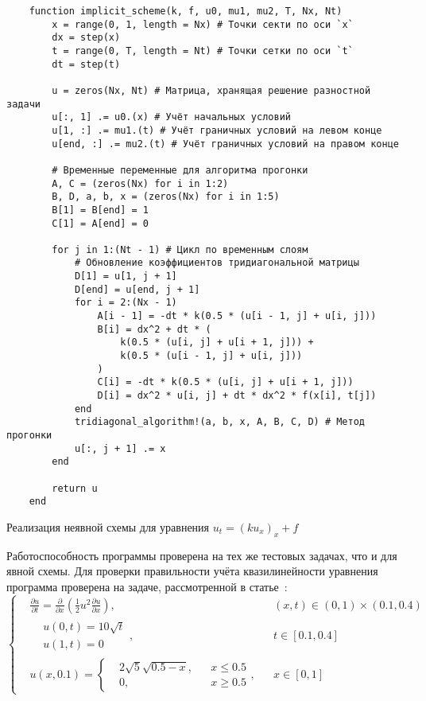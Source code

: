 \begin{listing}
    \begin{verbatim}
    function implicit_scheme(k, f, u0, mu1, mu2, T, Nx, Nt)
        x = range(0, 1, length = Nx) # Точки секти по оси `x`
        dx = step(x)
        t = range(0, T, length = Nt) # Точки сетки по оси `t`
        dt = step(t)
    
        u = zeros(Nx, Nt) # Матрица, хранящая решение разностной задачи
        u[:, 1] .= u0.(x) # Учёт начальных условий
        u[1, :] .= mu1.(t) # Учёт граничных условий на левом конце
        u[end, :] .= mu2.(t) # Учёт граничных условий на правом конце
    
        # Временные переменные для алгоритма прогонки
        A, C = (zeros(Nx) for i in 1:2)
        B, D, a, b, x = (zeros(Nx) for i in 1:5)
        B[1] = B[end] = 1
        C[1] = A[end] = 0
    
        for j in 1:(Nt - 1) # Цикл по временным слоям
            # Обновление коэффициентов тридиагональной матрицы
            D[1] = u[1, j + 1]
            D[end] = u[end, j + 1]
            for i = 2:(Nx - 1)
                A[i - 1] = -dt * k(0.5 * (u[i - 1, j] + u[i, j]))
                B[i] = dx^2 + dt * (
                    k(0.5 * (u[i, j] + u[i + 1, j])) +
                    k(0.5 * (u[i - 1, j] + u[i, j]))
                )
                C[i] = -dt * k(0.5 * (u[i, j] + u[i + 1, j]))
                D[i] = dx^2 * u[i, j] + dt * dx^2 * f(x[i], t[j])
            end
            tridiagonal_algorithm!(a, b, x, A, B, C, D) # Метод прогонки
            u[:, j + 1] .= x
        end
    
        return u
    end
    \end{verbatim}
    \caption{Реализация неявной схемы для уравнения $u_t = (ku_x)_x + f$}
    \label{listing:implicit_scheme}
\end{listing}
Работоспособность программы проверена на тех же тестовых задачах, что и для явной схемы.
Для проверки правильности учёта квазилинейности уравнения программа проверена на задаче, рассмотренной в статье~\cite{самарский1963примеры}:
\begin{equation*}
    \left\{
        \begin{aligned}
            &\frac{\partial u}{\partial t} = \frac{\partial }{\partial x}\left( \frac{1}{2}u^2 \frac{\partial u}{\partial x} \right), && (x, t) \in (0, 1)\times(0.1, 0.4)\\
            &\begin{aligned}
            &u(0, t) = 10\sqrt{t}\\
            &u(1, t) = 0
            \end{aligned}, && t\in [0.1, 0.4]\\
            &u(x, 0.1) = \left\{ \begin{aligned}
                &2\sqrt{5}\sqrt{0.5 - x}, && x \le 0.5\\
                & 0, && x\ge 0.5
            \end{aligned}\right. , && x \in [0, 1]
        \end{aligned}
    \right.
\end{equation*}
